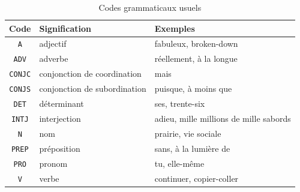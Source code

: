 \begin{table}[!h]
\begin{center}
\begin{tabular}{|c|l|l|}
\hline
\textbf{Code} & \textbf{Signification} & \textbf{Exemples} \\
\hline
\verb+A+ & adjectif & fabuleux, broken-down \\
\hline
\verb+ADV+ & adverbe & réellement, à la longue \\
\hline
\verb+CONJC+ & conjonction de coordination & mais\\
\hline
\verb+CONJS+ & conjonction de subordination & puisque, à moins que \\
\hline
\verb+DET+ & déterminant & ses, trente-six \\
\hline
\verb+INTJ+ & interjection & adieu, mille millions de mille sabords \\
\hline
\verb+N+ & nom & prairie, vie sociale\\
\hline
\verb+PREP+ & préposition & sans, à la lumière de \\
\hline
\verb+PRO+ & pronom & tu, elle-même \\
\hline
\verb+V+ & verbe & continuer, copier-coller\\
\hline
\end{tabular}
\caption{Codes grammaticaux usuels\label{tab-grammatical-codes}}
\end{center}
\end{table}
\vspace{-0.7cm}
